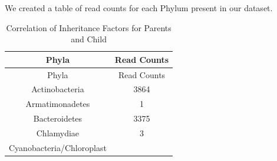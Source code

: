 \documentclass[12pt,twoside]{dukestatscithesis}
\begin{document}
We created a table of read counts for each Phylum present in our
dataset.
\begin{longtable}[]{@{}cc@{}}
\caption{Correlation of Inheritance Factors for Parents and
Child}\tabularnewline
\toprule
\begin{minipage}[b]{0.39\columnwidth}\centering\strut
Phyla\strut
\end{minipage} & \begin{minipage}[b]{0.20\columnwidth}\centering\strut
Read Counts\strut
\end{minipage}\tabularnewline
\midrule
\endfirsthead
\toprule
\begin{minipage}[b]{0.39\columnwidth}\centering\strut
Phyla\strut
\end{minipage} & \begin{minipage}[b]{0.20\columnwidth}\centering\strut
Read Counts\strut
\end{minipage}\tabularnewline
\midrule
\endhead
\begin{minipage}[t]{0.39\columnwidth}\centering\strut
Actinobacteria\strut
\end{minipage} & \begin{minipage}[t]{0.20\columnwidth}\centering\strut
3864\strut
\end{minipage}\tabularnewline
\begin{minipage}[t]{0.39\columnwidth}\centering\strut
Armatimonadetes\strut
\end{minipage} & \begin{minipage}[t]{0.20\columnwidth}\centering\strut
1\strut
\end{minipage}\tabularnewline
\begin{minipage}[t]{0.39\columnwidth}\centering\strut
Bacteroidetes\strut
\end{minipage} & \begin{minipage}[t]{0.20\columnwidth}\centering\strut
3375\strut
\end{minipage}\tabularnewline
\begin{minipage}[t]{0.39\columnwidth}\centering\strut
Chlamydiae\strut
\end{minipage} & \begin{minipage}[t]{0.20\columnwidth}\centering\strut
3\strut
\end{minipage}\tabularnewline
\begin{minipage}[t]{0.39\columnwidth}\centering\strut
Cyanobacteria/Chloroplast\strut
\end{minipage} & \begin{minipage}[t]{0.20\columnwidth}\centering\strut

\end{minipage}
\end{longtable}
\end{document}
